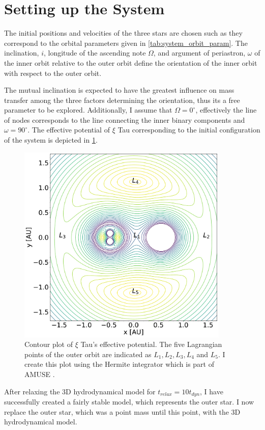 \section{Setting up the System}

The initial positions and velocities of the three stars are chosen such as they correspond to the orbital parameters given in \cref{tab:system_orbit_param}. The inclination, $i$, longitude of the ascending note $\Omega$, and argument of periastron, $\omega$ of the inner orbit relative to the outer orbit define the orientation of the inner orbit with respect to the outer orbit.

The mutual inclination is expected to have the greatest influence on mass transfer among the three factors determining the orientation, thus its a free parameter to be explored. Additionally, I assume that  $\Omega=0^{\circ}$, effectively the line of nodes corresponds to the line connecting the inner binary components and $\omega= 90^{\circ}$. The effective potential of $\xi$ Tau corresponding to the initial configuration of the system is depicted in \cref{fig:triple_equop}.
\begin{figure}[H]
    \centering
    \includegraphics[width=0.9\textwidth]{Thesis/graphs/triple_equop.pdf}
    \caption{Contour plot of $\xi$ Tau's effective potential. The five Lagrangian points of the outer orbit are indicated as $L_1, L_2, L_3, L_4$ and $L_5$. I create this plot using the Hermite integrator which is part of  AMUSE \citep{hut1995building}.}
    \label{fig:triple_equop}
\end{figure}

After relaxing the 3D hydrodynamical model for $t_{relax} =10 t_{dyn}$, I have successfully created a fairly stable model, which represents the outer star. I now replace the outer star, which was a point mass until this point, with the 3D hydrodynamical model.

